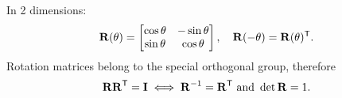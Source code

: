 In 2 dimensions:
\[
	\bm{\mathrm{R}}(\theta) =
	\begin{bmatrix}
		\cos \theta & -\sin \theta \\
		\sin \theta & \cos \theta
	\end{bmatrix},
	\quad
	\bm{\mathrm{R}}(-\theta)
	= \bm{\mathrm{R}}(\theta)^\mathsf{T}
	.
\]
Rotation matrices belong to the special orthogonal group, therefore
\[
	\bm{\mathrm{R}}\bm{\mathrm{R}}^\mathsf{T} = \bm{\mathrm{I}}
	\iff
	\bm{\mathrm{R}}^{-1} = \bm{\mathrm{R}}^\mathsf{T}
	\text{ and }
	\det \bm{\mathrm{R}} = 1.
\]
